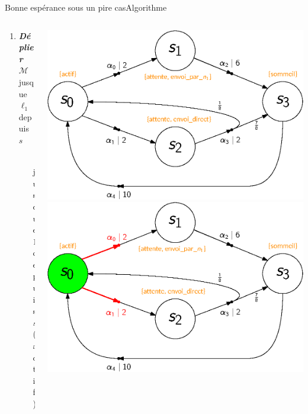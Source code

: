 \documentclass[compress]{beamer}
\theoremstyle{theorem}%
\begin{document}
\begin{frame}{Bonne espérance sous un pire cas}{Algorithme}
  \vspace{-.1\linewidth}
  \begin{columns}
    \begin{column}{0.55\linewidth}
      \begin{enumerate}
        \item \textbf{\textit{\color{fibeamer@orange}Déplier}} $\mathcal{M}$ jusque $\ell_1$ depuis $s$
        \begin{itemize}
          \item[$\rightarrow$] jusque $12$ depuis $s_0$ ({\color{DarkOrange} actif})
        \end{itemize}
      \end{enumerate}
    \end{column}
    \begin{column}{0.45\linewidth}
      \begin{overprint}
        \includegraphics[width=\linewidth]{resources/main-mdp3}
        \includegraphics[width=\linewidth]{resources/unfold1_5}

\end{overprint}
\end{column}
\end{columns}
\end{frame}
\end{document}
